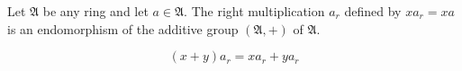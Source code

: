 Let $\mathfrak{A}$ be any ring and let $a \in \mathfrak{A}$. The right multiplication $a_r$ defined by $x a_r = xa$ is an endomorphism of the additive group $(\mathfrak{A}, +)$ of $\mathfrak{A}$.

$$(x + y) a_r = xa_r + y a_r$$
